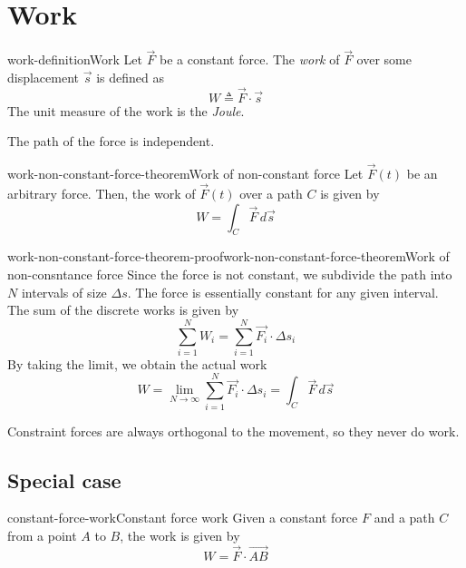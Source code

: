 \documentclass[preview]{standalone}
\begin{document}
\genpage

\section{Work}

\begin{snippetdefinition}{work-definition}{Work}
    Let \(\vec{F}\) be a constant force. The \emph{work}
    of \(\vec{F}\) over some displacement \(\vec{s}\) is defined as
    \[
        W \triangleq \vec{F} \cdot \vec{s}
    \]
    The unit measure of the work is the \emph{Joule}.
\end{snippetdefinition}

\begin{plainhtml}
    The path of the force is independent.
\end{plainhtml}

\begin{snippettheorem}{work-non-constant-force-theorem}{Work of non-constant force}
    Let \(\vec{F}(t)\) be an arbitrary force. Then, the work
    of \(\vec{F}(t)\) over a path \(C\) is given by
    \[
        W = \int_C \vec{F}\,d\vec{s}
    \]
\end{snippettheorem}

\begin{snippetproof}{work-non-constant-force-theorem-proof}{work-non-constant-force-theorem}{Work of non-consntance force}
    Since the force is not constant, we subdivide the path into \(N\) intervals of size \(\Delta s\).
    The force is essentially constant for any given interval. The sum of the discrete works is given by
    \[
        \sum_{i=1}^N W_i = \sum_{i=1}^N \vec{F_i} \cdot \Delta s_i
    \]
    By taking the limit, we obtain the actual work
    \[
        W = \lim_{N \to \infty} \sum_{i=1}^N \vec{F_i} \cdot \Delta s_i
        = \int_C \vec{F}\,d\vec{s}
    \]
\end{snippetproof}

\begin{plainhtml}
    Constraint forces are always orthogonal to the movement, so they never do work.
\end{plainhtml}

\subsection{Special case}

\begin{snippetproposition}{constant-force-work}{Constant force work}
    Given a constant force \(F\) and a path \(C\) from a point \(A\) to \(B\), the work is given by
    \[
        W = \vec{F} \cdot \vec{AB}
    \]
\end{snippetproposition}
\end{document}
